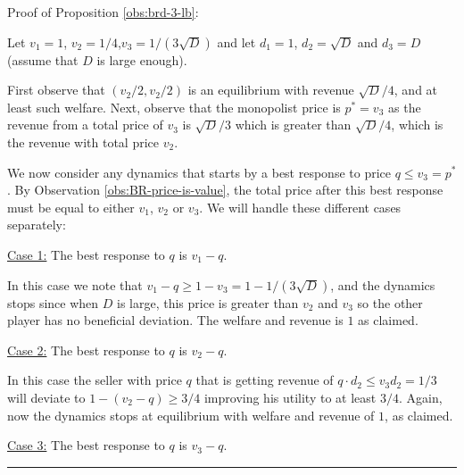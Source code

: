\documentclass[11pt,a4paper]{article}
\newcommand{\qed}{\rule{1.5mm}{2mm}\vspace{0.1in}}
\newenvironment{proof}{\par\noindent{\bf Proof:}}{\qed}
\begin{document}
Proof of Proposition \ref{obs:brd-3-lb}:
\begin{proof}
	Let $v_1=1$, $v_2= 1/4$,$v_3= 1/(3\sqrt{D}) $ and
	let $d_1=1$, $d_2= \sqrt{D}$ and $d_3=D$ (assume that $D$ is large enough).

    First observe that $(v_2/2,v_2/2)$ is an equilibrium with revenue $\sqrt{D}/4$, and at least such welfare.
    Next, observe that the monopolist price is $p^*=v_3$ as the revenue from a total price of $v_3$ is $\sqrt{D}/3$ which is greater than $\sqrt{D}/4$, which is
    the revenue with total price $v_2$. 	

    We now consider any dynamics that starts by a best response to price $q\leq v_3=p^*$. By Observation \ref{obs:BR-price-is-value}, the total price after this best response must be equal to either $v_1$, $v_2$ or $v_3$. We will handle these different cases separately:

    \vspace{2mm}

    \noindent \underline{Case 1:} The best response to $q$ is $v_1-q$.

    In this case we note that $v_1-q \geq 1-v_3=1- 1/(3\sqrt{D})$,  and the dynamics stops since when $D$ is large, this price is greater than $v_2$ and $v_3$ so the other player has no beneficial deviation.
    The welfare and revenue is $1$ as claimed.


    \vspace{2mm}

    \noindent \underline{Case 2:} The best response to $q$ is $v_2-q$.

    In this case the seller with price $q$ that is getting revenue of $q\cdot d_2 \leq v_3 d_2= 1/3$ will deviate to $1-(v_2-q)\geq 3/4$ improving his utility to at least $3/4$. Again, now the dynamics stops at equilibrium with welfare and revenue of $1$, as claimed.


    \vspace{2mm}

    \noindent \underline{Case 3:} The best response to $q$ is $v_3-q$.


\end{proof}
\end{document}

